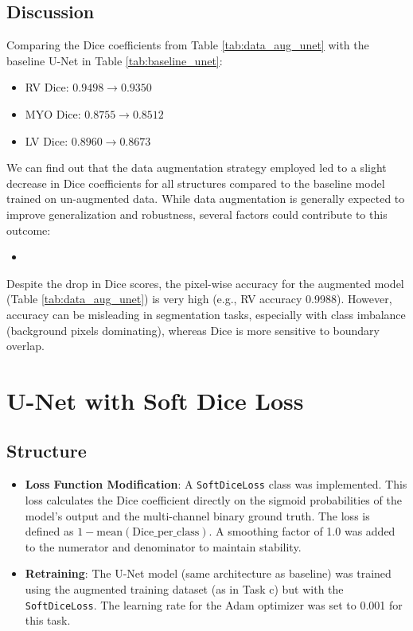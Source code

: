 \documentclass{article}
\begin{document}
\subsection{Discussion}
Comparing the Dice coefficients from Table \ref{tab:data_aug_unet} with the baseline U-Net in Table \ref{tab:baseline_unet}:
\begin{itemize}
  \item RV Dice: $0.9498 \rightarrow 0.9350$
  \item MYO Dice: $0.8755 \rightarrow 0.8512$
  \item LV Dice: $0.8960 \rightarrow 0.8673$
\end{itemize}
We can find out that the data augmentation strategy employed led to a slight decrease in Dice coefficients for all structures compared to the 
baseline model trained on un-augmented data. While data augmentation is generally expected to improve generalization and robustness, 
several factors could contribute to this outcome:
\begin{itemize}
  \item 
\end{itemize}
Despite the drop in Dice scores, the pixel-wise accuracy for the augmented model (Table \ref{tab:data_aug_unet}) is very high 
(e.g., RV accuracy 0.9988). However, accuracy can be misleading in segmentation tasks, especially with class imbalance 
(background pixels dominating), whereas Dice is more sensitive to boundary overlap.



\section{U-Net with Soft Dice Loss}

\subsection{Structure}
\begin{itemize}
  \item \textbf{Loss Function Modification}: A \texttt{SoftDiceLoss} class was implemented. This loss calculates the Dice 
  coefficient directly on the sigmoid probabilities of the model's output and the multi-channel binary ground truth. The 
  loss is defined as $1 - \text{mean}(\text{Dice\_per\_class})$. A smoothing factor of 1.0 was added to the numerator and 
  denominator to maintain stability.
  \item \textbf{Retraining}: The U-Net model (same architecture as baseline) was trained using the augmented training 
  dataset (as in Task c) but with the \texttt{SoftDiceLoss}. The learning rate for the Adam optimizer was set to 0.001 for this task.
\end{itemize}
\end{document}
